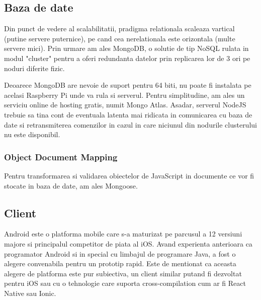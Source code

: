 \subsection {Baza de date}

Din punct de vedere al scalabilitatii, pradigma relationala scaleaza vartical (putine servere puternice), pe cand cea nerelationala este orizontala (multe servere mici). Prin urmare am ales MongoDB, o solutie de tip NoSQL rulata in modul "cluster" pentru a oferi redundanta datelor prin replicarea lor de 3 ori pe noduri diferite fizic.

Deoarece MongoDB are nevoie de suport pentru 64 biti, nu poate fi instalata pe acelasi Raspberry Pi unde va rula si serverul. Pentru simplitudine, am ales un serviciu online de hosting gratis, numit Mongo Atlas. Asadar, serverul NodeJS trebuie sa tina cont de eventuala latenta mai ridicata in comunicarea cu baza de date si retransmiterea comenzilor in cazul in care niciunul din nodurile clusterului nu este disponibil.

\subsubsection {Object Document Mapping}

Pentru transformarea si validarea obiectelor de JavaScript in documente ce vor fi stocate in baza de date, am ales Mongoose.

\subsection {Client}

Android este o platforma mobile care s-a maturizat pe parcusul a 12 versiuni majore si principalul competitor de piata al iOS. Avand experienta anterioara ca programator Android si in special cu limbajul de programare Java, a fost o alegere convenabila pentru un prototip rapid.
Este de mentionat ca aceasta alegere de platforma este pur subiectiva, un client similar putand fi dezvoltat pentru iOS sau cu o tehnologie care suporta cross-compilation cum ar fi React Native sau Ionic.

